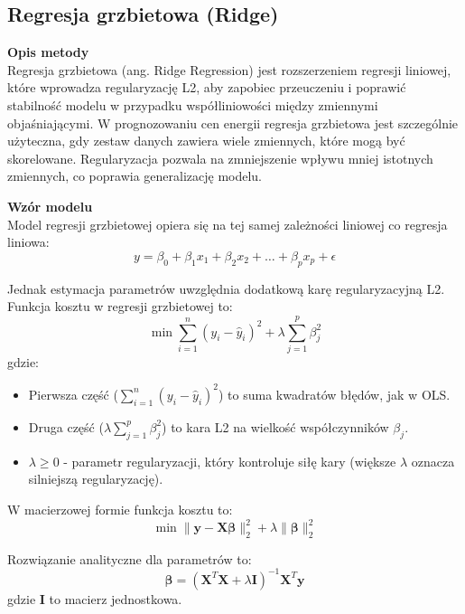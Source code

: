 \subsection{Regresja grzbietowa (Ridge)}

\textbf{Opis metody} \\
Regresja grzbietowa (ang. Ridge Regression) jest rozszerzeniem regresji liniowej, które wprowadza regularyzację L2, aby zapobiec przeuczeniu i poprawić stabilność modelu w przypadku współliniowości między zmiennymi objaśniającymi. W prognozowaniu cen energii regresja grzbietowa jest szczególnie użyteczna, gdy zestaw danych zawiera wiele zmiennych, które mogą być skorelowane. Regularyzacja pozwala na zmniejszenie wpływu mniej istotnych zmiennych, co poprawia generalizację modelu.

\textbf{Wzór modelu} \\
Model regresji grzbietowej opiera się na tej samej zależności liniowej co regresja liniowa:
\begin{equation}
y = \beta_0 + \beta_1 x_1 + \beta_2 x_2 + \dots + \beta_p x_p + \epsilon
\end{equation}

Jednak estymacja parametrów uwzględnia dodatkową karę regularyzacyjną L2. Funkcja kosztu w regresji grzbietowej to:
\begin{equation}
\min \sum_{i=1}^n (y_i - \hat{y}_i)^2 + \lambda \sum_{j=1}^p \beta_j^2
\end{equation}
gdzie:
\begin{itemize}
    \item Pierwsza część (\( \sum_{i=1}^n (y_i - \hat{y}_i)^2 \)) to suma kwadratów błędów, jak w OLS.
    \item Druga część (\( \lambda \sum_{j=1}^p \beta_j^2 \)) to kara L2 na wielkość współczynników \( \beta_j \).
    \item \( \lambda \geq 0 \) - parametr regularyzacji, który kontroluje siłę kary (większe \( \lambda \) oznacza silniejszą regularyzację).
\end{itemize}

W macierzowej formie funkcja kosztu to:
\begin{equation}
\min \|\mathbf{y} - \mathbf{X} \boldsymbol{\beta}\|_2^2 + \lambda \|\boldsymbol{\beta}\|_2^2
\end{equation}

Rozwiązanie analityczne dla parametrów to:
\begin{equation}
\boldsymbol{\beta} = (\mathbf{X}^T \mathbf{X} + \lambda \mathbf{I})^{-1} \mathbf{X}^T \mathbf{y}
\end{equation}
gdzie \( \mathbf{I} \) to macierz jednostkowa.

